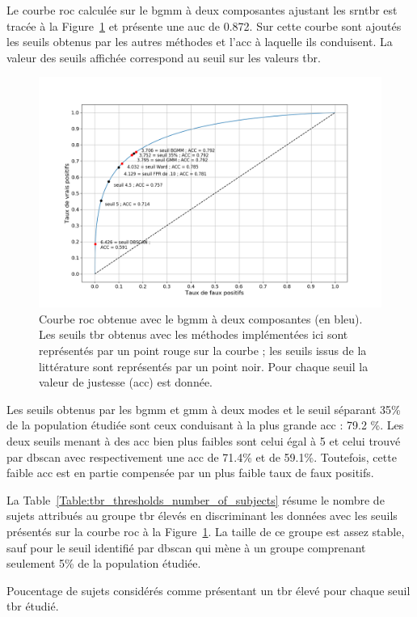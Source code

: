 Le courbe \gls{roc} calculée sur le \gls{bgmm} à deux composantes ajustant les \gls{srntbr} est tracée à la Figure~\ref{Figure:tbr_roc} et 
présente une \gls{auc} de 0.872. Sur cette courbe sont ajoutés les seuils obtenus par les autres méthodes et l'\gls{acc} à laquelle ils conduisent. 
La valeur des seuils affichée correspond au seuil sur les valeurs \gls{tbr}. 

\begin{figure}[h!]
  \centering
	\includegraphics[width=1.0\linewidth]{figures/chapter-4/tbr-roc} 
  \caption{Courbe \gls{roc} obtenue avec le \gls{bgmm} à deux composantes (en bleu). Les seuils \gls{tbr} obtenus avec les méthodes implémentées ici sont représentés 
	par un point rouge sur la courbe ; les seuils issus de la littérature sont représentés par un point noir. Pour chaque seuil la valeur de justesse (\gls{acc}) 
	est donnée.}
  \label{Figure:tbr_roc}
\end{figure}

Les seuils obtenus par les \gls{bgmm} et \gls{gmm} à deux modes et le seuil séparant 35\% de la population étudiée sont ceux conduisant à la plus grande \gls{acc} :
79.2 \%. Les deux seuils menant à des \gls{acc} bien plus faibles sont celui égal à 5 et celui trouvé par \gls{dbscan} avec respectivement une \gls{acc} de 71.4\%
et de 59.1\%. Toutefois, cette faible \gls{acc} est en partie compensée par un plus faible taux de faux positifs.

La Table~\ref{Table:tbr_thresholds_number_of_subjects} résume le nombre de sujets attribués au groupe \gls{tbr} élevés en discriminant les données 
avec les seuils présentés sur la courbe \gls{roc} à la Figure~\ref{Figure:tbr_roc}. La taille de ce groupe est assez stable, sauf pour le seuil identifié 
par \gls{dbscan} qui mène à un groupe comprenant seulement 5\% de la population étudiée.
\begin{table}[h!]
  \centering
  \caption{Poucentage de sujets considérés comme présentant un \gls{tbr} élevé pour chaque seuil \gls{tbr} étudié.}
  
  \label{Table:tbr_thresholds_number_of_subjects}
\end{table}


